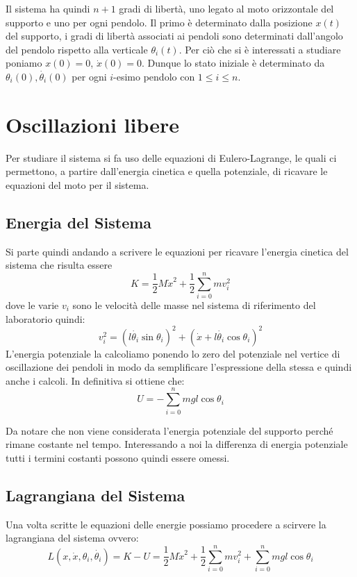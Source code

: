 \documentclass[a4paper, 12pt]{article}
\begin{document}
Il sistema ha quindi $n + 1$ gradi di libertà, uno legato al moto orizzontale del supporto e uno per ogni pendolo. Il primo è determinato dalla posizione $x(t)$ del supporto, i gradi di libertà associati ai pendoli sono determinati dall'angolo del pendolo rispetto alla verticale $\theta_i(t)$. Per ciò che si è interessati a studiare poniamo $x(0) = 0$, $\dot{x}(0) = 0$. Dunque lo stato iniziale è determinato da $\theta_i(0), \dot{\theta_i}(0)$ per ogni $i$-esimo pendolo con $1 \le i \le n$.

\section{Oscillazioni libere}

Per studiare il sistema si fa uso delle equazioni di Eulero-Lagrange, le quali ci permettono, a partire dall'energia cinetica e quella potenziale, di ricavare le equazioni del moto per il sistema.

\subsection{Energia del Sistema}

Si parte quindi andando a scrivere le equazioni per ricavare l'energia cinetica del sistema che risulta essere
\[
K = \frac{1}{2} M \dot{x}^2 + \frac{1}{2} \sum_{i = 0}^n m v_i^2
\]
dove le varie $v_i$ sono le velocità delle masse nel sistema di riferimento del laboratorio quindi:
\[
v_i^2 =\left( l \dot{\theta_i} \sin \theta_i \right) ^ 2 + \left( \dot{x} + l \dot{\theta_i} \cos \theta_i \right) ^ 2
\]
L'energia potenziale la calcoliamo ponendo lo zero del potenziale nel vertice di oscillazione dei pendoli in modo da semplificare l'espressione della stessa e quindi anche i calcoli. In definitiva si ottiene che: 
\[
U = - \sum_{i = 0}^n mgl\cos \theta_i
\]

Da notare che non viene considerata l'energia potenziale del supporto  perché rimane costante nel tempo. Interessando a noi la differenza di energia potenziale tutti i termini costanti possono quindi essere omessi.

\subsection{Lagrangiana del Sistema}

Una volta scritte le equazioni delle energie possiamo procedere a scirvere la lagrangiana del sistema ovvero:
\[
L\left(x, \dot{x}, \theta_i, \dot{\theta_i}\right) = K - U = \frac{1}{2} M \dot{x}^2 + \frac{1}{2} \sum_{i = 0}^n m v_i^2 + \sum_{i = 0}^n mgl\cos \theta_i
\]
\end{document}
